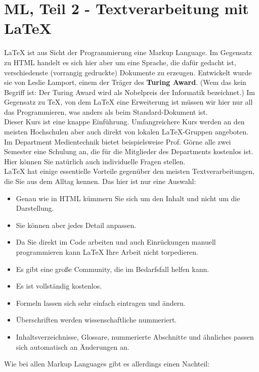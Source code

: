 \chapter{ML, Teil 2 - Textverarbeitung mit LaTeX}

LaTeX ist aus Sicht der Programmierung eine Markup Language. Im Gegensatz zu HTML handelt es sich hier aber um eine Sprache, die dafür gedacht ist, verschiedenste (vorrangig gedruckte) Dokumente zu erzeugen. Entwickelt wurde sie von Leslie Lamport, einem der Träger des \textbf{Turing Award}. (Wem das kein Begriff ist: Der Turing Award wird als Nobelpreis der Informatik bezeichnet.) Im Gegensatz zu TeX, von dem LaTeX eine Erweiterung ist müssen wir hier nur all das Programmieren, was anders als beim Standard-Dokument ist.\\

Dieser Kurs ist eine knappe Einführung. Umfangreichere Kurs werden an den meisten Hochschulen aber auch direkt von lokalen LaTeX-Gruppen angeboten. Im Department Medientechnik bietet beispielsweise Prof. Görne alle zwei Semester eine Schulung an, die für die Mitglieder des Departments kostenlos ist. Hier können Sie natürlich auch individuelle Fragen stellen.\\

LaTeX hat einige essentielle Vorteile gegenüber den meisten Textverarbeitungen, die Sie aus dem Alltag kennen. Das hier ist nur eine Auswahl:

\begin{itemize}
	\item Genau wie in HTML kümmern Sie sich um den Inhalt und nicht um die Darstellung.
	\item Sie können aber jedes Detail anpassen.
	\item Da Sie direkt im Code arbeiten und auch Einrückungen manuell programmieren kann LaTeX Ihre Arbeit nicht torpedieren.
	\item Es gibt eine große Community, die im Bedarfsfall helfen kann.
	\item Es ist vollständig kostenlos.
	\item Formeln lassen sich sehr einfach eintragen und ändern.
	\item Überschriften werden wissenschaftliche nummeriert.
	\item Inhaltsverzeichnisse, Glossare, nummerierte Abschnitte und ähnliches passen sich automatisch an Änderungen an.
\end{itemize}

Wie bei allen Markup Languages gibt es allerdings einen Nachteil:

